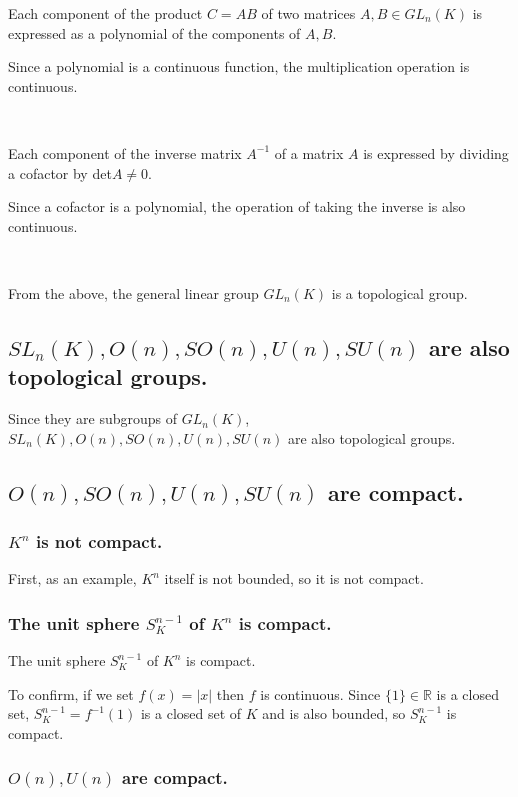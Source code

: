 \documentclass[uplatex,a4j,12pt,dvipdfmx]{jsarticle}
\begin{document}
Each component of the product $C=AB$ of two matrices $A,B \in GL_{n}(K)$ is expressed as a polynomial of the components of $A,B$.

Since a polynomial is a continuous function, the multiplication operation is continuous.

\ \ 

Each component of the inverse matrix $A^{-1}$ of a matrix $A$ is expressed by dividing a cofactor by det$A \neq 0$.

Since a cofactor is a polynomial, the operation of taking the inverse is also continuous.

\ \ 

From the above, the general linear group $GL_{n}(K)$ is a topological group.

\subsection{\textbf{$SL_{n}(K),O(n),SO(n),U(n),SU(n)$ are also topological groups.}}

Since they are subgroups of $GL_{n}(K)$, $SL_{n}(K),O(n),SO(n),U(n),SU(n)$ are also topological groups.



\subsection{\textbf{$O(n),SO(n),U(n),SU(n)$ are compact.}}

\subsubsection{\textbf{$K^{n}$ is not compact.}}

First, as an example, $K^{n}$ itself is not bounded, so it is not compact.


\subsubsection{\textbf{The unit sphere $S_{K}^{n-1}$ of $K^{n}$ is compact.}}

The unit sphere $S_{K}^{n-1}$ of $K^{n}$ is compact.

To confirm, if we set
$f(x) = |x|$
then $f$ is continuous.
Since $\{1\} \in \mathbb{R}$ is a closed set,
$S_{K}^{n-1} = f^{-1}(1)$ is a closed set of $K$ and is also bounded, so
$S_{K}^{n-1}$ is compact.


\subsubsection{\textbf{$O(n),U(n)$ are compact.}}
\end{document}
